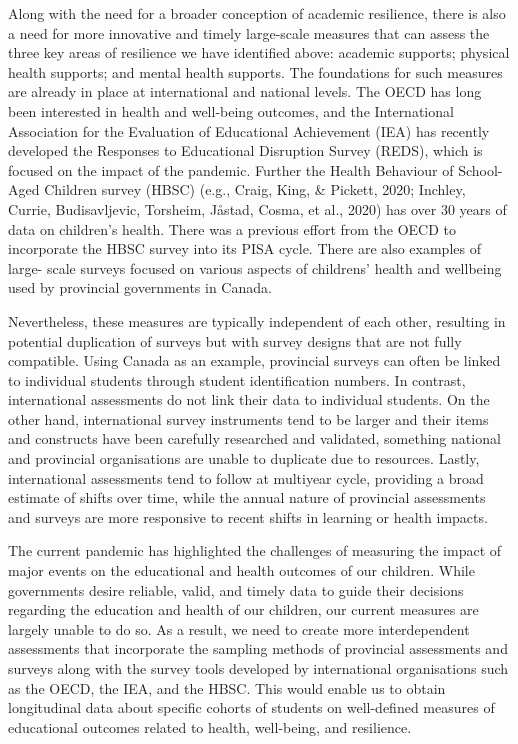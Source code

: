 \documentclass[
]{book}
\begin{document}
Along with the need for a broader conception of academic resilience, there is also a need for more innovative and timely large-scale measures that can assess the three key areas of resilience we have identified above: academic supports; physical health supports; and mental health supports. The foundations for such measures are already in place at international and national levels. The OECD has long been interested in health and well-being outcomes, and the International Association for the Evaluation of Educational Achievement (IEA) has recently developed the Responses to Educational Disruption Survey (REDS), which is focused on the impact of the pandemic. Further the Health Behaviour of School-Aged Children survey (HBSC) (e.g., Craig, King, \& Pickett, 2020; Inchley, Currie, Budisavljevic, Torsheim, Jåstad, Cosma, et al., 2020) has over 30 years of data on children's health. There was a previous effort from the OECD to incorporate the HBSC survey into its PISA cycle. There are also examples of large- scale surveys focused on various aspects of childrens' health and wellbeing used by provincial governments in Canada.

Nevertheless, these measures are typically independent of each other, resulting in potential duplication of surveys but with survey designs that are not fully compatible. Using Canada as an example, provincial surveys can often be linked to individual students through student identification numbers. In contrast, international assessments do not link their data to individual students. On the other hand, international survey instruments tend to be larger and their items and constructs have been carefully researched and validated, something national and provincial organisations are unable to duplicate due to resources. Lastly, international assessments tend to follow at multiyear cycle, providing a broad estimate of shifts over time, while the annual nature of provincial assessments and surveys are more responsive to recent shifts in learning or health impacts.

The current pandemic has highlighted the challenges of measuring the impact of major events on the educational and health outcomes of our children. While governments desire reliable, valid, and timely data to guide their decisions regarding the education and health of our children, our current measures are largely unable to do so. As a result, we need to create more interdependent assessments that incorporate the sampling methods of provincial assessments and surveys along with the survey tools developed by international organisations such as the OECD, the IEA, and the HBSC. This would enable us to obtain longitudinal data about specific cohorts of students on well-defined measures of educational outcomes related to health, well-being, and resilience.
\end{document}
